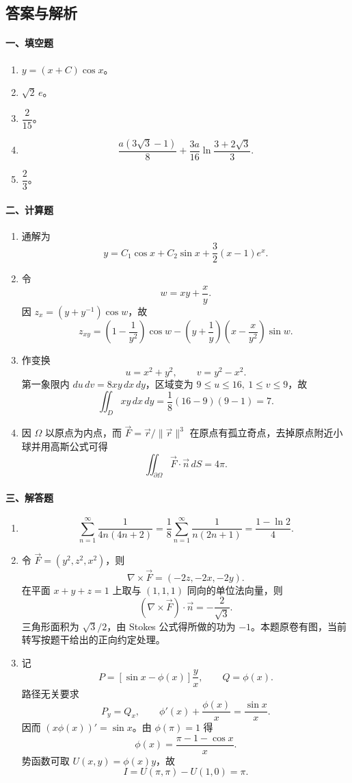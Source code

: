 \subsection{答案与解析}

\paragraph{一、填空题}
\begin{enumerate}
  \item $y=(x+C)\cos x$。
  \item $\sqrt2\,e$。
  \item $\dfrac{2}{15}$。
  \item
  \[
    \frac{a(3\sqrt3-1)}{8}
    +\frac{3a}{16}\ln\frac{3+2\sqrt3}{3}.
  \]
  \item $\dfrac23$。
\end{enumerate}

\paragraph{二、计算题}
\begin{enumerate}
  \item 通解为
  \[
    y=C_1\cos x+C_2\sin x+\frac32(x-1)e^x.
  \]
  \item 令
  \[
    w=xy+\frac{x}{y}.
  \]
  因 $z_x=(y+y^{-1})\cos w$，故
  \[
    z_{xy}
    =\left(1-\frac1{y^2}\right)\cos w
    -\left(y+\frac1y\right)\left(x-\frac{x}{y^2}\right)\sin w.
  \]
  \item 作变换
  \[
    u=x^2+y^2,\qquad v=y^2-x^2.
  \]
  第一象限内 $du\,dv=8xy\,dx\,dy$，区域变为 $9\le u\le16,\ 1\le v\le9$，故
  \[
    \iint_D xy\,dx\,dy
    =\frac18(16-9)(9-1)=7.
  \]
  \item 因 $\Omega$ 以原点为内点，而 $\vec F=\vec r/\|\vec r\|^3$ 在原点有孤立奇点，去掉原点附近小球并用高斯公式可得
  \[
    \iint_{\partial\Omega}\vec F\cdot\vec n\,dS=4\pi.
  \]
\end{enumerate}

\paragraph{三、解答题}
\begin{enumerate}
  \item
  \[
    \sum_{n=1}^\infty\frac1{4n(4n+2)}
    =\frac18\sum_{n=1}^\infty\frac1{n(2n+1)}
    =\frac{1-\ln2}{4}.
  \]
  \item 令 $\vec F=(y^2,z^2,x^2)$，则
  \[
    \nabla\times\vec F=(-2z,-2x,-2y).
  \]
  在平面 $x+y+z=1$ 上取与 $(1,1,1)$ 同向的单位法向量，则
  \[
    (\nabla\times\vec F)\cdot\vec n=-\frac2{\sqrt3}.
  \]
  三角形面积为 $\sqrt3/2$，由 Stokes 公式得所做的功为 $-1$。本题原卷有图，当前转写按题干给出的正向约定处理。
  \item 记
  \[
    P=\left[\sin x-\phi(x)\right]\frac{y}{x},\qquad Q=\phi(x).
  \]
  路径无关要求
  \[
    P_y=Q_x,\qquad \phi'(x)+\frac{\phi(x)}{x}=\frac{\sin x}{x}.
  \]
  因而 $(x\phi(x))'=\sin x$。由 $\phi(\pi)=1$ 得
  \[
    \phi(x)=\frac{\pi-1-\cos x}{x}.
  \]
  势函数可取 $U(x,y)=\phi(x)y$，故
  \[
    I=U(\pi,\pi)-U(1,0)=\pi.
  \]
\end{enumerate}

